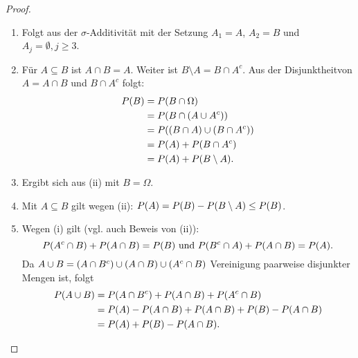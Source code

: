 \documentclass{lecture}
\begin{document}
    \begin{proof}
        \begin{enumerate}
            \item Folgt aus der \(\sigma\)-Additivität mit der Setzung \(A_1 = A\), \(A_2 = B\) und \(A_j = \emptyset, j \ge 3\).
            \item Für \(A \subseteq B\) ist \(A \cap B = A\).
            Weiter ist \(B \setminus A = B \cap A^c\).
            Aus der Disjunktheitvon \(A = A \cap B\) und \(B \cap A^c\) folgt:
            \begin{align*}
                P\parentheses*{B} &= P\parentheses*{B \cap \Omega}\\
                &= P\parentheses*{B \cap \parentheses*{A \cup A^c}}\\
                &= P\parentheses*{\parentheses*{B \cap A} \cup \parentheses*{B \cap A^c}}\\
                &= P\parentheses*{A} + P\parentheses*{B \cap A^c}\\
                &= P\parentheses*{A} + P\parentheses*{B \setminus A}.
            \end{align*}
            \item Ergibt sich aus (ii) mit \(B = \Omega\).
            \item Mit \(A \subseteq B\) gilt wegen (ii): \(P\parentheses*{A} = P\parentheses*{B} - P\parentheses*{B \setminus A} \le P\parentheses*{B}\).
            \item Wegen (i) gilt (vgl. auch Beweis von (ii)):
            \[
                P\parentheses*{A^c \cap B} + P\parentheses*{A \cap B} = P\parentheses*{B}\text{ und }P\parentheses*{B^c \cap A} + P\parentheses*{A \cap B} = P\parentheses*{A}.
            \]
            Da \(A \cup B = \parentheses*{A \cap B^c} \cup \parentheses*{A \cap B} \cup \parentheses*{A^c \cap B}\) Vereinigung paarweise disjunkter Mengen ist, folgt
            \begin{align*}
                P\parentheses*{A \cup B} &= P\parentheses*{A \cap B^c} + P\parentheses*{A \cap B} + P\parentheses*{A^c \cap B}\\
                &= P\parentheses*{A} - P\parentheses*{A \cap B} + P\parentheses*{A \cap B} + P\parentheses*{B} - P\parentheses*{A \cap B}\\
                &= P\parentheses*{A} + P\parentheses*{B} - P\parentheses*{A \cap B}.
            \end{align*}
        \end{enumerate}
    \end{proof}
\end{document}
